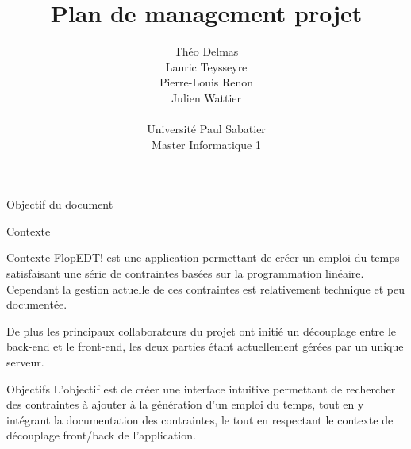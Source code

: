 \documentclass[]{article}
\title{Plan de management projet}
\author{
    Théo Delmas\\
    Lauric Teysseyre\\
    Pierre-Louis Renon\\
    Julien Wattier\\
    \\
    Université Paul Sabatier\\
    Master Informatique 1\\
   }
\date{}
\begin{document}
\maketitle
\newpage
\tableofcontents
\newpage

\begin{section}{Objectif du document}

\end{section}

\begin{section}{Contexte}
    \begin{subsection}{Contexte}
        FlopEDT! est une application permettant de créer un emploi du temps satisfaisant une série de contraintes basées sur 
        la programmation linéaire. Cependant la gestion actuelle de ces contraintes est relativement technique et peu documentée.

        De plus les principaux collaborateurs du projet ont initié un découplage entre le back-end et le front-end, les deux parties étant actuellement gérées par un unique serveur.
    \end{subsection}

    \begin{subsection}{Objectifs}
        L’objectif est de créer une interface intuitive permettant de rechercher des contraintes à ajouter à la génération 
        d’un emploi du temps, tout en y intégrant la documentation des contraintes, le tout en respectant le contexte de découplage front/back de l'application.
    \end{subsection}
\end{section}
\end{document}
